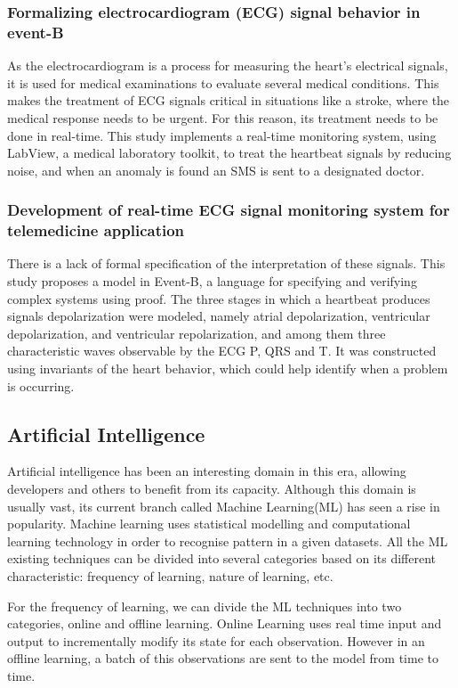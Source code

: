 \subsubsection{Formalizing electrocardiogram (ECG) signal behavior in event-B}

As the electrocardiogram is a process for measuring the heart's electrical signals, it is used for medical examinations to evaluate several medical conditions. This makes the treatment of ECG signals critical in situations like a stroke, where the medical response needs to be urgent. For this reason, its treatment needs to be done in real-time. This study implements a real-time monitoring system, using LabView, a medical laboratory toolkit, to treat the heartbeat signals by reducing noise, and when an anomaly is found an SMS is sent to a designated doctor.

\subsubsection{Development of real-time ECG signal monitoring system for telemedicine application}
There is a lack of formal specification of the interpretation of these signals. This study proposes a model in Event-B, a language for specifying and verifying complex systems using proof. The three stages in which a heartbeat produces signals depolarization were modeled, namely atrial depolarization, ventricular depolarization, and ventricular repolarization, and among them three characteristic waves observable by the ECG P, QRS and T. It was constructed using invariants of the heart behavior, which could help identify when a problem is occurring.


\subsection{Artificial Intelligence} 
Artificial intelligence has been an interesting domain in this era, allowing developers and others to benefit from its capacity. Although this domain is usually vast, its current branch called Machine Learning(ML) has seen a rise in popularity. Machine learning uses statistical modelling and computational learning technology in order to recognise pattern in a given datasets. All the ML existing techniques can be divided into several categories based on its different characteristic: frequency of learning, nature of learning, etc.

For the frequency of learning, we can divide the ML techniques into two categories, online and offline learning. Online Learning uses real time input and output to incrementally modify its state for each observation. However in an offline learning, a batch of this observations are sent to the model from time to time.

